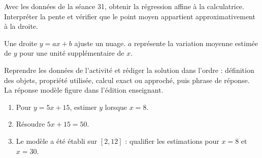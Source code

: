 \begin{activite}
Avec les données de la séance 31, obtenir la régression affine à la calculatrice. Interpréter la pente et vérifier que le point moyen appartient approximativement à la droite.
\begin{center}\end{center}
\end{activite}

\begin{traceecrite}Une droite $y=ax+b$ ajuste un nuage. $a$ représente la variation moyenne estimée de $y$ pour une unité supplémentaire de $x$.\end{traceecrite}

\begin{exemple}
Reprendre les données de l'activité et rédiger la solution dans l'ordre : définition des objets, propriété utilisée, calcul exact ou approché, puis phrase de réponse. La réponse modèle figure dans l'édition enseignant.
\end{exemple}

\begin{exercice}[-- essentiel]
\begin{enumerate}\item Pour $y=5x+15$, estimer $y$ lorsque $x=8$.\item Résoudre $5x+15=50$.\item Le modèle a été établi sur $[2,12]$ : qualifier les estimations pour $x=8$ et $x=30$.\end{enumerate}
\end{exercice}

